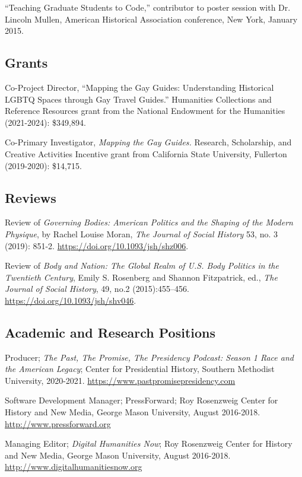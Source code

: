 \documentclass[11pt]{article}
\begin{document}
``Teaching Graduate Students to Code,'' contributor to poster session with Dr. Lincoln Mullen, American Historical Association conference, New York, January 2015.

\subsection{Grants}
Co-Project Director, ``Mapping the Gay Guides: Understanding Historical LGBTQ Spaces through Gay Travel Guides.'' Humanities Collections and Reference Resources grant from the National Endowment for the Humanities (2021-2024): \$349,894.

Co-Primary Investigator, \emph{Mapping the Gay Guides.} Research, Scholarship, and Creative Activities Incentive grant from California State University, Fullerton (2019-2020): \$14,715.

\subsection{Reviews}\label{reviews}

Review of \emph{Governing Bodies: American Politics and the Shaping of the Modern Physique}, by Rachel Louise Moran, \emph{The Journal of Social History} 53, no. 3 (2019): 851-2. \url{https://doi.org/10.1093/jsh/shz006}.

Review of \emph{Body and Nation: The Global Realm of U.S. Body Politics in the Twentieth Century}, Emily S. Rosenberg and Shannon Fitzpatrick, ed., \emph{The Journal of Social History}, 49, no.2 (2015):455–456. \url{https://doi.org/10.1093/jsh/shv046}.

\subsection{Academic and Research Positions}

Producer; \emph{The Past, The Promise, The Presidency Podcast: Season 1 Race and the American Legacy}; Center for Presidential History, Southern Methodist University, 2020-2021. \url{https://www.pastpromisepresidency.com}

Software Development Manager; PressForward; Roy Rosenzweig Center for History and New Media, George Mason University, August 2016-2018. \url{http://www.pressforward.org}

Managing Editor; \emph{Digital Humanities Now}; Roy Rosenzweig Center for History and New Media, George Mason University, August 2016-2018. \url{http://www.digitalhumanitiesnow.org}
\end{document}
